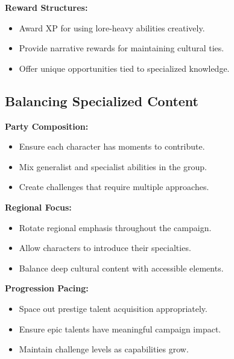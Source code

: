 \textbf{Reward Structures:}
\begin{itemize}
    \item Award XP for using lore-heavy abilities creatively.
    \item Provide narrative rewards for maintaining cultural ties.
    \item Offer unique opportunities tied to specialized knowledge.
\end{itemize}

\subsection{Balancing Specialized Content}\label{subsec:balancing_content}

\textbf{Party Composition:}
\begin{itemize}
    \item Ensure each character has moments to contribute.
    \item Mix generalist and specialist abilities in the group.
    \item Create challenges that require multiple approaches.
\end{itemize}

\textbf{Regional Focus:}
\begin{itemize}
    \item Rotate regional emphasis throughout the campaign.
    \item Allow characters to introduce their specialties.
    \item Balance deep cultural content with accessible elements.
\end{itemize}

\textbf{Progression Pacing:}
\begin{itemize}
    \item Space out prestige talent acquisition appropriately.
    \item Ensure epic talents have meaningful campaign impact.
    \item Maintain challenge levels as capabilities grow.
\end{itemize}

